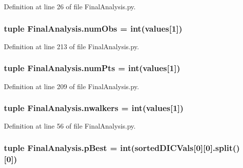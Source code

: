Definition at line 26 of file Final\-Analysis.\-py.

\hypertarget{namespace_final_analysis_a38df881ad911780b915aa9e19ebb7dc6}{
\subsubsection[{num\-Obs}]{\setlength{\rightskip}{0pt plus 5cm}tuple Final\-Analysis.\-num\-Obs = int({\bf values}\mbox{[}1\mbox{]})}}\label{namespace_final_analysis_a38df881ad911780b915aa9e19ebb7dc6}


Definition at line 213 of file Final\-Analysis.\-py.

\hypertarget{namespace_final_analysis_ab417da76d397a990dd95199dccc1b61b}{
\subsubsection[{num\-Pts}]{\setlength{\rightskip}{0pt plus 5cm}tuple Final\-Analysis.\-num\-Pts = int({\bf values}\mbox{[}1\mbox{]})}}\label{namespace_final_analysis_ab417da76d397a990dd95199dccc1b61b}


Definition at line 209 of file Final\-Analysis.\-py.

\hypertarget{namespace_final_analysis_aa7ae3a71cd02bd6488a119cf3041b24e}{
\subsubsection[{nwalkers}]{\setlength{\rightskip}{0pt plus 5cm}tuple Final\-Analysis.\-nwalkers = int({\bf values}\mbox{[}1\mbox{]})}}\label{namespace_final_analysis_aa7ae3a71cd02bd6488a119cf3041b24e}


Definition at line 56 of file Final\-Analysis.\-py.

\hypertarget{namespace_final_analysis_a4cb7be1a71ae9339b38be19665d4816b}{
\subsubsection[{p\-Best}]{\setlength{\rightskip}{0pt plus 5cm}tuple Final\-Analysis.\-p\-Best = int({\bf sorted\-D\-I\-C\-Vals}\mbox{[}0\mbox{]}\mbox{[}0\mbox{]}.split()\mbox{[}0\mbox{]})}}\label{namespace_final_analysis_a4cb7be1a71ae9339b38be19665d4816b}


